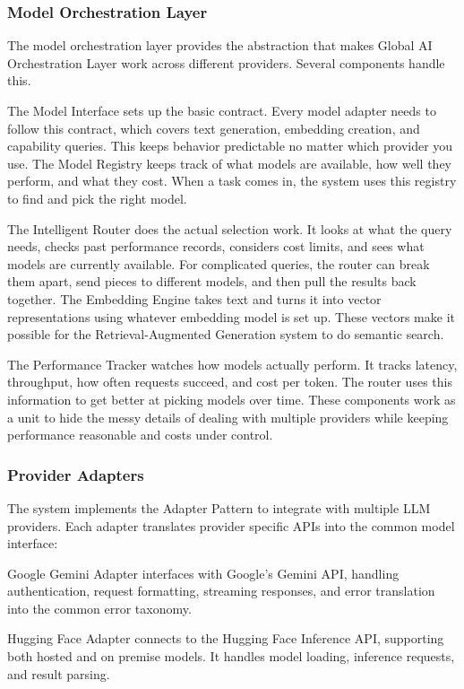 \documentclass[final,5p,times,twocolumn,authoryear,draft]{elsarticle}
\begin{document}
\subsubsection{Model Orchestration Layer}

The model orchestration layer provides the abstraction that makes Global AI Orchestration Layer work across different providers. Several components handle this.

The Model Interface sets up the basic contract. Every model adapter needs to follow this contract, which covers text generation, embedding creation, and capability queries. This keeps behavior predictable no matter which provider you use. The Model Registry keeps track of what models are available, how well they perform, and what they cost. When a task comes in, the system uses this registry to find and pick the right model.

The Intelligent Router does the actual selection work. It looks at what the query needs, checks past performance records, considers cost limits, and sees what models are currently available. For complicated queries, the router can break them apart, send pieces to different models, and then pull the results back together. The Embedding Engine takes text and turns it into vector representations using whatever embedding model is set up. These vectors make it possible for the Retrieval-Augmented Generation system to do semantic search.

The Performance Tracker watches how models actually perform. It tracks latency, throughput, how often requests succeed, and cost per token. The router uses this information to get better at picking models over time. These components work as a unit to hide the messy details of dealing with multiple providers while keeping performance reasonable and costs under control.

\subsubsection{Provider Adapters}

The system implements the Adapter Pattern to integrate with multiple LLM providers. Each adapter translates provider specific APIs into the common model interface:

Google Gemini Adapter interfaces with Google's Gemini API, handling authentication, request formatting, streaming responses, and error translation into the common error taxonomy.

Hugging Face Adapter connects to the Hugging Face Inference API, supporting both hosted and on premise models. It handles model loading, inference requests, and result parsing.
\end{document}
